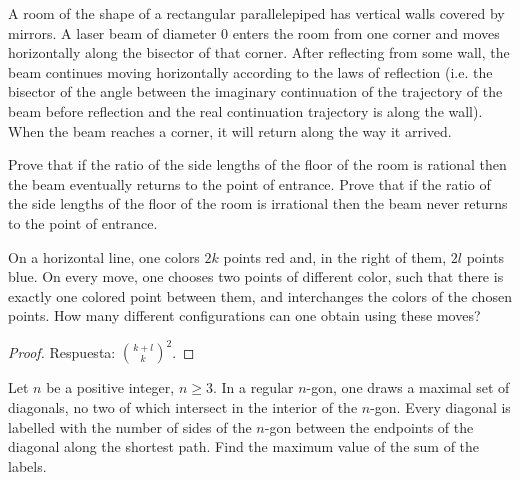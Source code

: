 \begin{probEG}[Estonia National Olympiad 2020/10.1\protect\footnote{Un video relacionado de \href{https://www.youtube.com/c/MatesMike}{Mates Mike}: \url{https://www.youtube.com/watch?v=5PAGXnPTE94}.}]
	A room of the shape of a rectangular parallelepiped has vertical walls covered by mirrors. A laser beam of diameter $0$ enters the room from one corner and moves horizontally along the bisector of that corner. After reflecting from some wall, the beam continues moving horizontally according to the laws of reflection (i.e. the bisector of the angle between the imaginary continuation of the trajectory of the beam before reflection and the real continuation trajectory is along the wall). When the beam reaches a corner, it will return along the way it arrived.
	\begin{enumerate}[(a)]
		\ii Prove that if the ratio of the side lengths of the floor of the room is rational then the beam eventually returns to the point of entrance.
		\ii Prove that if the ratio of the side lengths of the floor of the room is irrational then the beam never returns to the point of entrance.
	\end{enumerate}
\end{probEG}

\begin{probEG}
	On a horizontal line, one colors $2k$ points red and, in the right of them, $2l$ points blue. On every move, one chooses two points of different color, such that there is exactly one colored point between them, and interchanges the colors of the chosen points. How many different configurations can one obtain using these moves?
\end{probEG}

\begin{proof}
	Respuesta: $\binom{k+l}{k}^2$.
\end{proof}

\begin{problem}
	Let $n$ be a positive integer, $n\ge 3$. In a regular $n$-gon, one draws a maximal set of diagonals, no two of which intersect in the interior of the $n$-gon. Every diagonal is labelled with the number of sides of the $n$-gon between the endpoints of the diagonal along the shortest path. Find the maximum value of the sum of the labels.
\end{problem}


